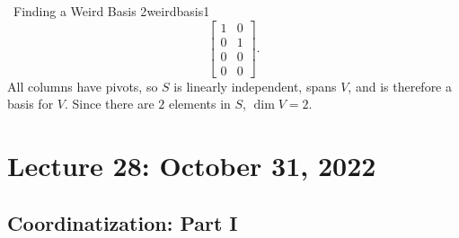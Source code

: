 \begin{example}{\Difficulty\,\Difficulty\,\,Finding a Weird Basis 2}{weirdbasis1}
\begin{equation*}
                \begin{bmatrix}
                    1 & 0 \\
                    0 & 1 \\
                    0 & 0 \\
                    0 & 0
                \end{bmatrix}.
            \end{equation*}
            All columns have pivots, so \(S\) is linearly independent, spans \(V\), and is therefore a basis for \(V\). Since there are \(2\) elements in \(S\), \(\dim V=2\).

        \end{example}

\pagebreak

\section{Lecture 28: October 31, 2022}

    \subsection{Coordinatization: Part I}

